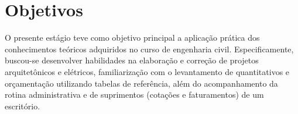 \chapter[OBJETIVOS]{Objetivos}

O presente estágio teve como objetivo principal a aplicação prática dos conhecimentos teóricos adquiridos no curso de engenharia civil. Especificamente, buscou-se desenvolver habilidades na elaboração e correção de projetos arquitetônicos e elétricos, familiarização com o levantamento de quantitativos e orçamentação utilizando tabelas de referência, além do acompanhamento da rotina administrativa e de suprimentos (cotações e faturamentos) de um escritório.